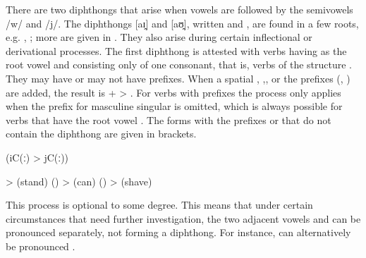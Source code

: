 There are two diphthongs that arise when vowels are followed by the semivowels /w/ and /j/. The diphthongs [aɪ̯] and [aʊ̯], written  and , are found in a few roots, e.g.  ,  ; more are given in . They also arise during certain inflectional or derivational processes. The first diphthong is attested with verbs having  as the root vowel and consisting only of one consonant, that is, verbs of the structure . They may have or may not have  prefixes. When a spatial  , ,, or the  prefixes (, ) are added, the result is  +  > . For verbs with  prefixes the process only applies when the  prefix  for masculine singular is omitted, which is always possible for verbs that have the root vowel . The forms with the  prefixes  or  that do not contain the diphthong are given in brackets.
%
\begin{exe}
	 (iC(ː) > jC(ː))\label{ex:a i aj phon}
	\begin{xlist}
		\ex	{} >   (stand) ()
		\ex	{} >   (can) ()
		\ex	{} >   (shave)
	\end{xlist}
\end{exe}

This process is optional to some degree. This means that under certain circumstances that need further investigation, the two adjacent vowels  and  can be pronounced separately, not forming a diphthong. For instance,  can alternatively be pronounced  .

